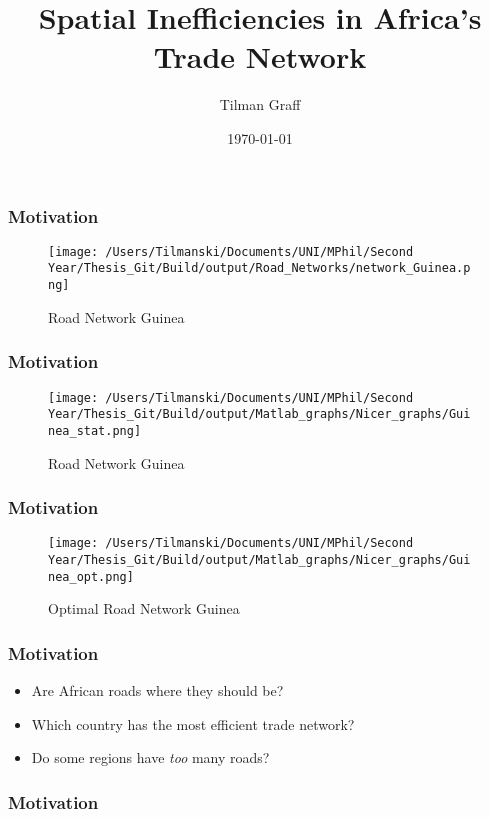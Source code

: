 \documentclass[]{beamer}   	%
\title{Spatial Inefficiencies in Africa's Trade Network}
\author{Tilman Graff}
\institute{University of Oxford}
\date{\today}
\begin{document}
\begin{frame}
  \titlepage
\end{frame}

\begin{frame}
  \frametitle{Motivation}
  \begin{figure}
    \texttt{[image: /Users/Tilmanski/Documents/UNI/MPhil/Second Year/Thesis\_Git/Build/output/Road\_Networks/network\_Guinea.png]}
    \caption{Road Network Guinea}

  \end{figure}
\end{frame}

\begin{frame}
  \frametitle{Motivation}
\begin{figure}
    \texttt{[image: /Users/Tilmanski/Documents/UNI/MPhil/Second Year/Thesis\_Git/Build/output/Matlab\_graphs/Nicer\_graphs/Guinea\_stat.png]}
    \caption{Road Network Guinea}

  \end{figure}
\end{frame}

\begin{frame}
  \frametitle{Motivation}
\begin{figure}
    \texttt{[image: /Users/Tilmanski/Documents/UNI/MPhil/Second Year/Thesis\_Git/Build/output/Matlab\_graphs/Nicer\_graphs/Guinea\_opt.png]}
    \caption{Optimal Road Network Guinea}

  \end{figure}
\end{frame}

\begin{frame}
  \frametitle{Motivation}
  \begin{itemize}
    \item Are African roads where they should be?
    \item Which country has the most efficient trade network?
    \item Do some regions have \emph{too} many roads?
  \end{itemize}
\end{frame}

\begin{frame}
  \frametitle{Motivation}
  \centering
   \\
\end{frame}
\end{document}
